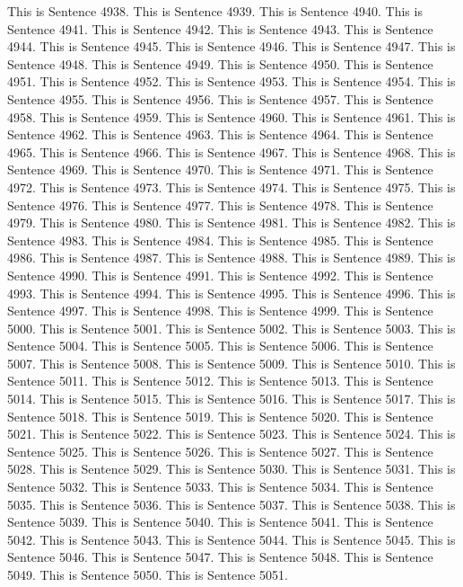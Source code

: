 \documentclass{article}
\begin{document}
This is Sentence 4938.
This is Sentence 4939.
This is Sentence 4940.
This is Sentence 4941.
This is Sentence 4942.
This is Sentence 4943.
This is Sentence 4944.
This is Sentence 4945.
This is Sentence 4946.
This is Sentence 4947.
This is Sentence 4948.
This is Sentence 4949.
This is Sentence 4950.
This is Sentence 4951.
This is Sentence 4952.
This is Sentence 4953.
This is Sentence 4954.
This is Sentence 4955.
This is Sentence 4956.
This is Sentence 4957.
This is Sentence 4958.
This is Sentence 4959.
This is Sentence 4960.
This is Sentence 4961.
This is Sentence 4962.
This is Sentence 4963.
This is Sentence 4964.
This is Sentence 4965.
This is Sentence 4966.
This is Sentence 4967.
This is Sentence 4968.
This is Sentence 4969.
This is Sentence 4970.
This is Sentence 4971.
This is Sentence 4972.
This is Sentence 4973.
This is Sentence 4974.
This is Sentence 4975.
This is Sentence 4976.
This is Sentence 4977.
This is Sentence 4978.
This is Sentence 4979.
This is Sentence 4980.
This is Sentence 4981.
This is Sentence 4982.
This is Sentence 4983.
This is Sentence 4984.
This is Sentence 4985.
This is Sentence 4986.
This is Sentence 4987.
This is Sentence 4988.
This is Sentence 4989.
This is Sentence 4990.
This is Sentence 4991.
This is Sentence 4992.
This is Sentence 4993.
This is Sentence 4994.
This is Sentence 4995.
This is Sentence 4996.
This is Sentence 4997.
This is Sentence 4998.
This is Sentence 4999.
This is Sentence 5000.
This is Sentence 5001.
This is Sentence 5002.
This is Sentence 5003.
This is Sentence 5004.
This is Sentence 5005.
This is Sentence 5006.
This is Sentence 5007.
This is Sentence 5008.
This is Sentence 5009.
This is Sentence 5010.
This is Sentence 5011.
This is Sentence 5012.
This is Sentence 5013.
This is Sentence 5014.
This is Sentence 5015.
This is Sentence 5016.
This is Sentence 5017.
This is Sentence 5018.
This is Sentence 5019.
This is Sentence 5020.
This is Sentence 5021.
This is Sentence 5022.
This is Sentence 5023.
This is Sentence 5024.
This is Sentence 5025.
This is Sentence 5026.
This is Sentence 5027.
This is Sentence 5028.
This is Sentence 5029.
This is Sentence 5030.
This is Sentence 5031.
This is Sentence 5032.
This is Sentence 5033.
This is Sentence 5034.
This is Sentence 5035.
This is Sentence 5036.
This is Sentence 5037.
This is Sentence 5038.
This is Sentence 5039.
This is Sentence 5040.
This is Sentence 5041.
This is Sentence 5042.
This is Sentence 5043.
This is Sentence 5044.
This is Sentence 5045.
This is Sentence 5046.
This is Sentence 5047.
This is Sentence 5048.
This is Sentence 5049.
This is Sentence 5050.
This is Sentence 5051.
\end{document}
